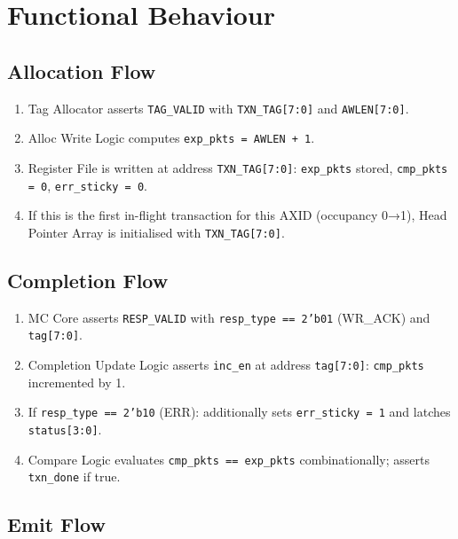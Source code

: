 \documentclass[11pt,a4paper]{article}
\begin{document}
\section{Functional Behaviour}

\subsection{Allocation Flow}

\begin{enumerate}
  \item Tag Allocator asserts \texttt{TAG\_VALID} with
        \texttt{TXN\_TAG[7:0]} and \texttt{AWLEN[7:0]}.
  \item Alloc Write Logic computes \texttt{exp\_pkts = AWLEN + 1}.
  \item Register File is written at address \texttt{TXN\_TAG[7:0]}:
        \texttt{exp\_pkts} stored, \texttt{cmp\_pkts = 0},
        \texttt{err\_sticky = 0}.
  \item If this is the first in-flight transaction for this AXID
        (occupancy 0→1), Head Pointer Array is initialised with
        \texttt{TXN\_TAG[7:0]}.
\end{enumerate}

\subsection{Completion Flow}

\begin{enumerate}
  \item MC Core asserts \texttt{RESP\_VALID} with
        \texttt{resp\_type == 2'b01} (WR\_ACK) and \texttt{tag[7:0]}.
  \item Completion Update Logic asserts \texttt{inc\_en} at address
        \texttt{tag[7:0]}: \texttt{cmp\_pkts} incremented by 1.
  \item If \texttt{resp\_type == 2'b10} (ERR): additionally sets
        \texttt{err\_sticky = 1} and latches \texttt{status[3:0]}.
  \item Compare Logic evaluates \texttt{cmp\_pkts == exp\_pkts}
        combinationally; asserts \texttt{txn\_done} if true.
\end{enumerate}

\subsection{Emit Flow}
\end{document}
